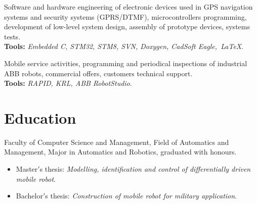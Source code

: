 \documentclass[11pt,a4paper,sans]{moderncv} %
\begin{document}
{Software and hardware engineering of electronic devices used in GPS navigation systems and security systems (GPRS/DTMF), microcontrollers programming, development of low-level system design, assembly of prototype devices, systems tests. \\ \textbf{Tools:} \textit{Embedded C, STM32, STM8, SVN, Doxygen, CadSoft Eagle,~\LaTeX}.}

{Mobile service activities, programming and periodical inspections of industrial ABB robots, commercial offers, customers technical support. \\ \textbf{Tools:} \textit{RAPID, KRL, ABB RobotStudio}.}



\section{Education}

{Faculty of Computer Science and Management, Field of Automatics and Management, Major in Automatics and Robotics, graduated with honours.
\begin{itemize}
\item Master$'$s thesis: \textit{Modelling, identification and control of differentially driven mobile robot}.
\item Bachelor$'$s thesis: \textit{Construction of mobile robot for military application}.
\end{itemize}}



\end{document}

